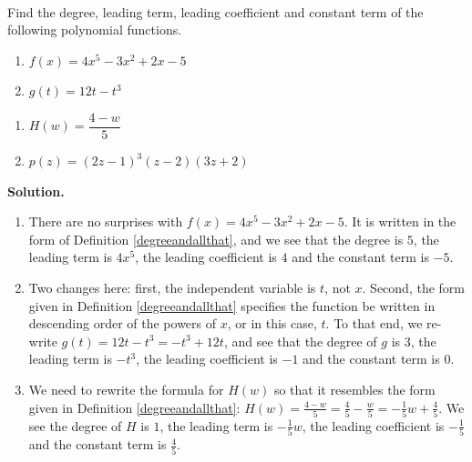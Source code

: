 \documentclass{ximera}
\begin{document}
\begin{example}  \label{degreandallthatexample} $~$

Find the degree, leading term, leading coefficient and constant term of the following polynomial functions.

\begin{multicols}{2}
\begin{enumerate}

\item  $f(x) = 4x^5 - 3x^2 + 2x - 5$
\item $g(t) = 12t - t^3$

\setcounter{HW}{\value{enumi}}
\end{enumerate}
\end{multicols}

\begin{multicols}{2}
\begin{enumerate}
\setcounter{enumi}{\value{HW}}

\item  $H(w) = \dfrac{4-w}{5}$
\item  $p(z) = (2z-1)^{3}(z-2)(3z+2)$ 

\end{enumerate}
\end{multicols}

\smallskip

{\bf Solution.}  

\begin{enumerate}

\item  There are no surprises with $f(x) = 4x^5 - 3x^2 + 2x - 5$.  It is written in the form of Definition \ref{degreeandallthat}, and we see that the degree is $5$, the leading term is $4x^5$, the leading coefficient is $4$ and the constant term is $-5$.

\item Two changes here: first, the independent variable is $t$, not $x$.    Second, the form given in Definition \ref{degreeandallthat} specifies the function be written in descending order of the powers of $x$, or in this case, $t$.   To that end, we re-write $g(t) = 12t  - t^3 = -t^3+12t$, and see that the degree of $g$ is $3$, the leading term is $- t^3$, the leading coefficient is $-1$ and the constant term is $0$.

\item  We need to rewrite the formula for $H(w)$ so that it resembles the form given in Definition \ref{degreeandallthat}:  $H(w) = \frac{4-w}{5} = \frac{4}{5} - \frac{w}{5} = -\frac{1}{5} w + \frac{4}{5}$.  We see the degree of $H$ is $1$, the leading term is $-\frac{1}{5} w$, the leading coefficient is $-\frac{1}{5}$ and the constant term is $\frac{4}{5}$.


\end{enumerate}
\end{example}
\end{document}
